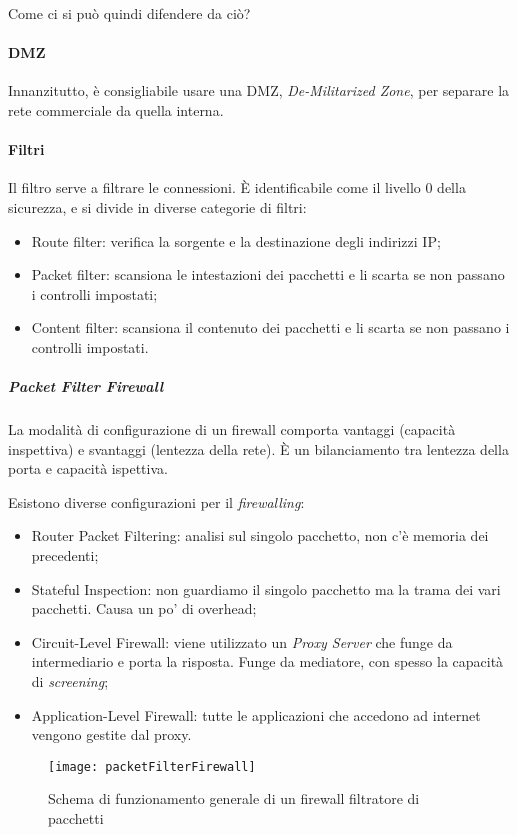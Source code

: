 Come ci si può quindi difendere da ciò?
\paragraph*{DMZ} Innanzitutto, è consigliabile usare una DMZ,
\textit{De-Militarized Zone}, per separare la rete commerciale da quella
interna.



\paragraph*{Filtri}

Il filtro serve a filtrare le connessioni. È identificabile come il livello 0
della sicurezza, e si divide in diverse categorie di filtri:
\begin{itemize}
\item Route filter: verifica la sorgente e la destinazione degli indirizzi IP;
\item Packet filter: scansiona le intestazioni dei pacchetti e li scarta se non
passano i controlli impostati;
\item Content filter: scansiona il contenuto dei pacchetti e li scarta se non
passano i controlli impostati.
\end{itemize}

\subparagraph*{Packet Filter Firewall}

La modalità di configurazione di un firewall comporta vantaggi (capacità
inspettiva) e svantaggi (lentezza della rete). È un bilanciamento tra lentezza
della porta e capacità ispettiva.

Esistono diverse configurazioni per il \textit{firewalling}:
\begin{itemize}
 \item Router Packet Filtering: analisi sul singolo pacchetto, non c'è memoria
dei precedenti;
 \item Stateful Inspection: non guardiamo il singolo pacchetto ma la trama dei
vari pacchetti. Causa un po' di overhead;
 \item Circuit-Level Firewall: viene utilizzato un \textit{Proxy Server} che
funge da intermediario e porta la risposta. Funge da mediatore, con spesso la
capacità di \textit{screening};
 \item Application-Level Firewall: tutte le applicazioni che accedono ad
internet vengono gestite dal proxy.
\end{itemize}


\begin{figure}[H]
 \centering
 \texttt{[image: packetFilterFirewall]}
 \caption{Schema di funzionamento generale di un firewall filtratore di
pacchetti}
\end{figure}

